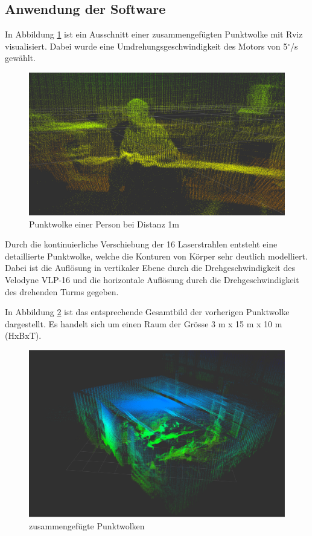 \subsection{Anwendung der Software}

In Abbildung \ref{fig:pointcloud_test} ist ein Ausschnitt einer zusammengefügten Punktwolke mit Rviz visualisiert. Dabei wurde eine Umdrehungsgeschwindigkeit des Motors von 5$^\circ$/s gewählt. 

\begin{figure}[H]
	\centering
	\includegraphics[width=1.0\textwidth]{resources/pointcloud_test.png}
	\caption[Punktwolke einer Person bei Distanz 1m]{Punktwolke einer Person bei Distanz 1m}
	\label{fig:pointcloud_test}
\end{figure}

Durch die kontinuierliche Verschiebung der 16 Laserstrahlen entsteht eine detaillierte Punktwolke, welche die Konturen von Körper sehr deutlich modelliert. Dabei ist die Auflösung in vertikaler Ebene durch die Drehgeschwindigkeit des Velodyne VLP-16 und die horizontale Auflösung durch die Drehgeschwindigkeit des drehenden Turms gegeben.


In Abbildung \ref{fig:raumausmessung} ist das entsprechende Gesamtbild der vorherigen Punktwolke dargestellt. Es handelt sich um einen Raum der Grösse 3 m x 15 m x 10 m (HxBxT). 

\begin{figure}[H]
	\centering
	\includegraphics[width=1.0\textwidth]{resources/raumausmessung.png}
	\caption[zusammengefügte Punktwolken]{zusammengefügte Punktwolken}
	\label{fig:raumausmessung}
\end{figure}  

